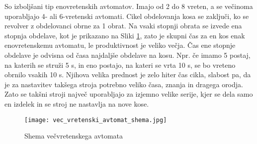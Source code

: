 So izboljšani tip enovretenskih avtomatov. Imajo od
2 do 8 vreten, a se večinoma uporabljajo 4- ali 6-vretenski avtomati. Cikel obdelovanja kosa se zaključi,
ko se revolver z obdelovanci obrne za 1 obrat. Na vsaki stopnji
obrata se izvede ena stopnja obdelave, kot je prikazano na
Sliki \ref{vec_vretenc}, zato je skupni čas za en
kos enak enovretenskemu avtomatu, le produktivnost je veliko
večja. Čas ene stopnje obdelave je odvisna od časa najdaljše
obdelave na kosu. Npr. če imamo 5 postaj, na katerih se struži 5 s,
in eno postajo, na kateri se vrta 10 s, se bo vreteno obrnilo vsakih 10 s.
Njihova velika prednost je zelo hiter čas cikla, slabost pa,
da je za nastavitev takšega stroja potrebno veliko časa, znanja
in dragega orodja. Zato se takšni stroji največ uporabljajo za
izjemno velike serije, kjer se dela samo en izdelek in se stroj
ne nastavlja na nove kose.

\begin{figure}[H]
	\begin{center}
		\texttt{[image: vec\_vretenski\_avtomat\_shema.jpg]}
		\caption{Shema večvretenskega avtomata
			\cite{vec_vretenska_struznica_shema}}
		\label{vec_vretenc}
	\end{center}
\end{figure}